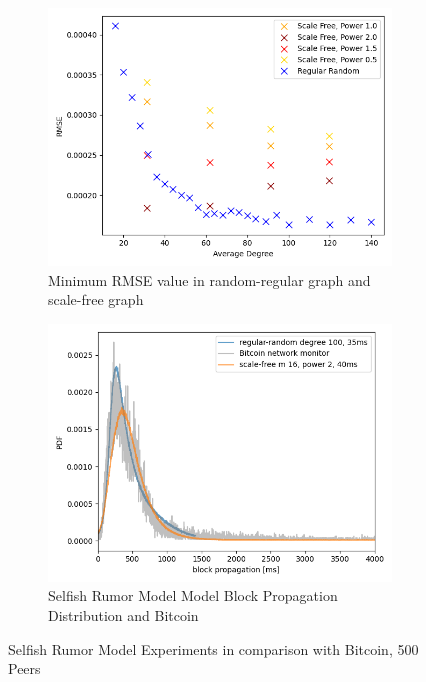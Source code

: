 \begin{figure}[h! t]
\begin{subfigure}[b]{0.48\textwidth}
		\includegraphics[width=\textwidth]{figures/rmse_min.png}
		\caption{Minimum RMSE value in random-regular graph and scale-free graph}
		\label{fig:minRMSE}
	\end{subfigure}
	\hfill
	\begin{subfigure}[b]{0.48\textwidth}
		\includegraphics[width=\textwidth]{figures/propagation_histogram_withBitcoin.png}
		\caption{Selfish Rumor Model Model Block Propagation Distribution and Bitcoin}
		\label{fig:SRMBitcoin2}
	\end{subfigure}
\caption{Selfish Rumor Model Experiments in comparison with Bitcoin, 500 Peers}
\label{fig:SMRBitcoin}
\end{figure}

